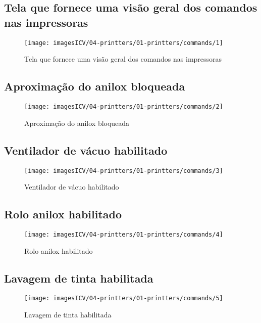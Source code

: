 \usepackage{graphicx}
\newpage
\thispagestyle{fancy}
\vspace{\fill}

\subsection{Tela que fornece uma visão geral dos comandos nas impressoras}
\begin{figure}
    \centering
    \texttt{[image: imagesICV/04-printters/01-printters/commands/1]}
    \caption{Tela que fornece uma visão geral dos comandos nas impressoras}
\end{figure}
\newpage
\thispagestyle{fancy}
\vspace{\fill}

\subsection{Aproximação do anilox bloqueada}
\begin{figure}
    \centering
    \texttt{[image: imagesICV/04-printters/01-printters/commands/2]}
    \caption{Aproximação do anilox bloqueada}
\end{figure}
\newpage
\thispagestyle{fancy}
\vspace{\fill}

\subsection{Ventilador de vácuo habilitado}
\begin{figure}
    \centering
    \texttt{[image: imagesICV/04-printters/01-printters/commands/3]}
    \caption{Ventilador de vácuo habilitado}
\end{figure}
\newpage
\thispagestyle{fancy}
\vspace{\fill}

\subsection{Rolo anilox habilitado}
\begin{figure}
    \centering
    \texttt{[image: imagesICV/04-printters/01-printters/commands/4]}
    \caption{Rolo anilox habilitado}
\end{figure}
\newpage
\thispagestyle{fancy}
\vspace{\fill}

\subsection{Lavagem de tinta habilitada}
\begin{figure}
    \centering
    \texttt{[image: imagesICV/04-printters/01-printters/commands/5]}
    \caption{Lavagem de tinta habilitada}
\end{figure}
\newpage
\thispagestyle{fancy}
\vspace{\fill}

